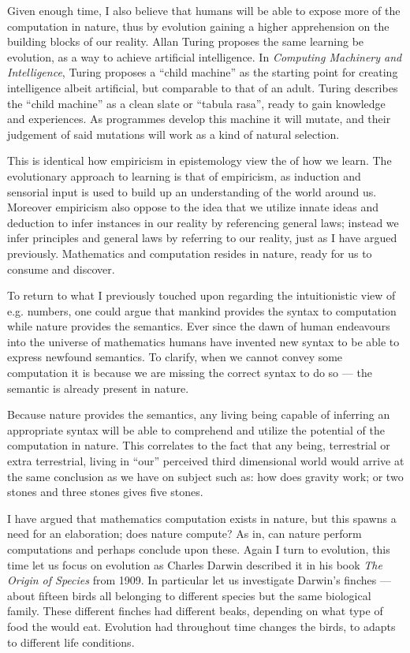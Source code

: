 \bigskip
Given enough time, I also believe that humans will be able to expose more of the computation in nature, thus by evolution gaining a higher apprehension on the building blocks of our reality.
Allan Turing proposes the same learning be evolution, as a way to achieve artificial intelligence.
In \textit{Computing Machinery and Intelligence}, Turing proposes a \enquote{child machine} as the starting point for creating intelligence albeit artificial, but comparable to that of an adult.
Turing describes the \enquote{child machine} as a clean slate or \enquote{tabula rasa}, ready to gain knowledge and experiences.
As programmes develop this machine it will mutate, and their judgement of said mutations will work as a kind of natural selection.

This is identical how empiricism in epistemology view the of how we learn.
The evolutionary approach to learning is that of empiricism, as induction and sensorial input is used to build up an understanding of the world around us.
Moreover empiricism also oppose to the idea that we utilize innate ideas and deduction to infer instances in our reality by referencing general laws;
instead we infer principles and general laws by referring to our reality, just as I have argued previously.
Mathematics and computation resides in nature, ready for us to consume and discover.

\bigskip
To return to what I previously touched upon regarding the intuitionistic view of e.g. numbers, one could argue that mankind provides the syntax to computation while nature provides the semantics.
Ever since the dawn of human endeavours into the universe of mathematics humans have invented new syntax to be able to express newfound semantics.
To clarify, when we cannot convey some computation it is because we are missing the correct syntax to do so --- the semantic is already present in nature.

Because nature provides the semantics, any living being capable of inferring an appropriate syntax will be able to comprehend and utilize the potential of the computation in nature.
This correlates to the fact that any being, terrestrial or extra terrestrial, living in \enquote{our} perceived third dimensional world would arrive at the same conclusion as we have on subject such as: how does gravity work; or two stones and three stones gives five stones.

\bigskip
I have argued that mathematics computation exists in nature, but this spawns a need for an elaboration; does nature compute?
As in, can nature perform computations and perhaps conclude upon these.
Again I turn to evolution, this time let us focus on evolution as Charles Darwin described it in his book \textit{The Origin of Species} from 1909.
In particular let us investigate Darwin's finches --- about fifteen birds all belonging to different species but the same biological family.
These different finches had different beaks, depending on what type of food the would eat.
Evolution had throughout time changes the birds, to adapts to different life conditions.

